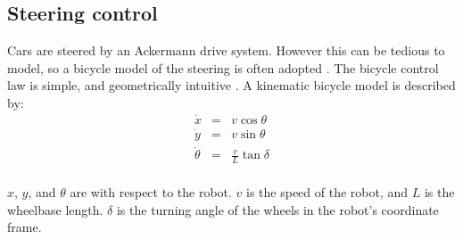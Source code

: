 \subsection{Steering control}
Cars are steered by an Ackermann drive system. However this can be tedious to model, so a bicycle model of the steering is often adopted \cite{article:motion_planning,article:lateral_control,thesis:darpa}. The bicycle control law is simple, and geometrically intuitive \cite{article:motion_planning}. A kinematic bicycle model is described by:
\begin{eqnarray} \label{eq:bike_model}
\dot{x}&=&v\cos\theta \\
\dot{y}&=&v\sin\theta \\
\dot{\theta}&=&\frac{v}{L}\tan\delta \\
\end{eqnarray}

$x$, $y$, and $\theta$ are with respect to the robot. $v$ is the speed of the robot, and $L$ is the wheelbase length. $\delta$ is the turning angle of the wheels in the robot's coordinate frame.

